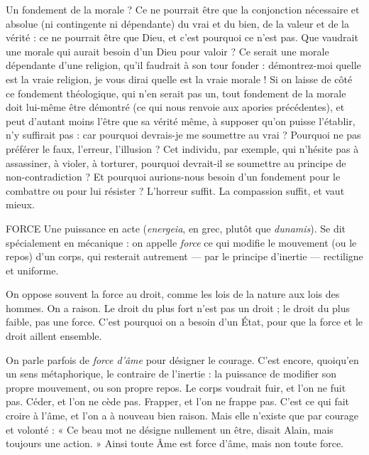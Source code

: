 Un fondement de la morale ? Ce ne pourrait être que la conjonction nécessaire
et absolue (ni contingente ni dépendante) du vrai et du bien, de la valeur
et de la vérité : ce ne pourrait être que Dieu, et c’est pourquoi ce n’est pas. Que
vaudrait une morale qui aurait besoin d’un Dieu pour valoir ? Ce serait une
morale dépendante d’une religion, qu’il faudrait à son tour fonder : démontrez-moi
quelle est la vraie religion, je vous dirai quelle est la vraie morale ! Si on
laisse de côté ce fondement théologique, qui n’en serait pas un, tout fondement
de la morale doit lui-même être démontré (ce qui nous renvoie aux apories précédentes),
et peut d’autant moins l’être que sa vérité même, à supposer qu’on
puisse l’établir, n’y suffirait pas : car pourquoi devrais-je me soumettre au vrai ?
Pourquoi ne pas préférer le faux, l'erreur, l'illusion ? Cet individu, par exemple,
qui n’hésite pas à assassiner, à violer, à torturer, pourquoi devrait-il se soumettre
au principe de non-contradiction ? Et pourquoi aurions-nous besoin
d’un fondement pour le combattre ou pour lui résister ? L’horreur suffit. La
compassion suffit, et vaut mieux.

FORCE Une puissance en acte ({\it energeia}, en grec, plutôt que {\it dunamis}). Se
dit spécialement en mécanique : on appelle {\it force} ce qui modifie le
mouvement (ou le repos) d’un corps, qui resterait autrement — par le principe
d’inertie — rectiligne et uniforme.

On oppose souvent la force au droit, comme les lois de la nature aux lois
des hommes. On a raison. Le droit du plus fort n’est pas un droit ; le droit du
plus faible, pas une force. C’est pourquoi on a besoin d’un État, pour que la
force et le droit aillent ensemble.

On parle parfois de {\it force d'âme} pour désigner le courage. C’est encore,
quoiqu'en un sens métaphorique, le contraire de l’inertie : la puissance de
modifier son propre mouvement, ou son propre repos. Le corps voudrait fuir,
et l'on ne fuit pas. Céder, et l’on ne cède pas. Frapper, et l’on ne frappe pas.
C'est ce qui fait croire à l'âme, et l’on a à nouveau bien raison. Mais elle
n'existe que par courage et volonté : « Ce beau mot ne désigne nullement un
être, disait Alain, mais toujours une action. » Ainsi toute Âme est force d'âme,
mais non toute force.

